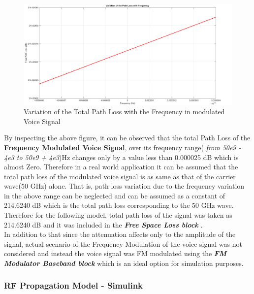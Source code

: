 \documentclass[a4paper,11pt]{article}%
\begin{document}
\begin{figure}[!h]
	\centering
	\includegraphics[scale = 0.36]{figures/voicePL}
	\caption{Variation of the Total Path Loss with the Frequency in modulated Voice Signal}
\end{figure}

By inspecting the above figure, it can be observed that the total Path Loss of the \textbf{Frequency Modulated Voice Signal}, over its frequency range( \textit{from 50e9 - 4e3 to 50e9 + 4e3})Hz changes only by a value less than 0.000025 dB which is almost Zero. Therefore in a real world application it can be assumed that the total path loss of the modulated voice signal is as same as that of the carrier wave(50 GHz) alone. That is, path loss variation due to the frequency variation in the above range can be neglected and can be assumed as a constant of 214.6240 dB which is the total path loss corresponding to the 50 GHz wave. Therefore for the following model, total path loss of the signal was taken as 214.6240 dB and it was included in the \textbf{\textit{Free Space Loss block}} .\\

In addition to that since the attenuation affects only to the amplitude of the signal, actual scenario of the Frequency Modulation of the voice signal was not considered and instead the voice signal was FM modulated using the \textbf{\textit{FM Modulator Baseband block}} which is an ideal option for simulation purposes. 
\vspace{2cm}
\subsubsection{RF Propagation Model - Simulink}
\end{document}
